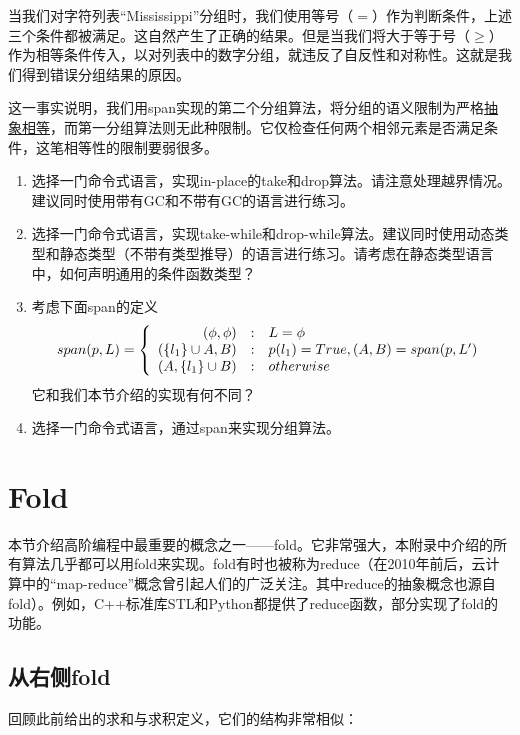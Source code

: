 \documentclass[UTF8]{article}
\begin{document}
当我们对字符列表“Mississippi”分组时，我们使用等号（$=$）作为判断条件，上述三个条件都被满足。这自然产生了正确的结果。但是当我们将大于等于号（$\geq$）作为相等条件传入，以对列表中的数字分组，就违反了自反性和对称性。这就是我们得到错误分组结果的原因。

这一事实说明，我们用span实现的第二个分组算法，将分组的语义限制为严格\underline{抽象相等}，而第一分组算法则无此种限制。它仅检查任何两个相邻元素是否满足条件，这笔相等性的限制要弱很多。

\begin{Exercise}
\begin{enumerate}
\item 选择一门命令式语言，实现in-place的take和drop算法。请注意处理越界情况。建议同时使用带有GC和不带有GC的语言进行练习。
\item 选择一门命令式语言，实现take-while和drop-while算法。建议同时使用动态类型和静态类型（不带有类型推导）的语言进行练习。请考虑在静态类型语言中，如何声明通用的条件函数类型？
\item 考虑下面span的定义
\[
span(p, L) =  \left \{
  \begin{array}
  {r@{\quad:\quad}l}
  (\phi, \phi) & L = \phi \\
  (\{ l_1 \} \cup A, B) & p(l_1) = True, (A, B) = span(p, L') \\
  (A, \{l_1\} \cup B) & otherwise
  \end{array}
\right.
\]
它和我们本节介绍的实现有何不同？
\item 选择一门命令式语言，通过span来实现分组算法。
\end{enumerate}
\end{Exercise}

\section{Fold}

本节介绍高阶编程中最重要的概念之一——fold。它非常强大，本附录中介绍的所有算法几乎都可以用fold来实现。fold有时也被称为reduce（在2010年前后，云计算中的“map-reduce”概念曾引起人们的广泛关注。其中reduce的抽象概念也源自fold）。例如，C++标准库STL和Python都提供了reduce函数，部分实现了fold的功能。

\subsection{从右侧fold}

回顾此前给出的求和与求积定义，它们的结构非常相似：
\end{document}
